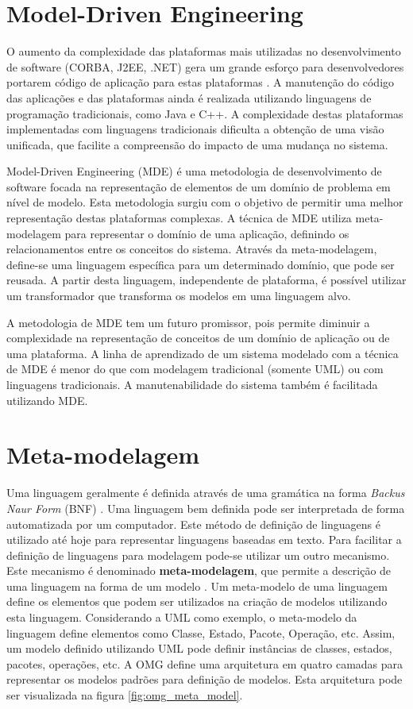 \section{Model-Driven Engineering}

O aumento da complexidade das plataformas mais utilizadas no desenvolvimento de software (CORBA, J2EE, .NET) gera um grande esforço para
desenvolvedores portarem código de aplicação para estas plataformas \cite{Schmidt:2006:GEI:1115688.1115706}. A manutenção do código das aplicações e
das plataformas ainda é realizada utilizando linguagens de programação tradicionais, como Java e C++. A complexidade destas plataformas implementadas
com linguagens tradicionais dificulta a obtenção de uma visão unificada, que facilite a compreensão do impacto de uma mudança no sistema.

Model-Driven Engineering (MDE)  é uma metodologia de desenvolvimento de software focada na representação de
elementos de um domínio de problema em nível de modelo. Esta metodologia surgiu com o objetivo de permitir uma melhor representação destas plataformas
complexas. A técnica de MDE utiliza meta-modelagem para representar o domínio de uma aplicação, definindo os relacionamentos entre os conceitos do
sistema. Através da meta-modelagem, define-se uma linguagem específica para um determinado domínio, que pode ser reusada. A partir desta linguagem,
independente de plataforma, é possível utilizar um transformador que transforma os modelos em uma linguagem alvo.

A metodologia de MDE tem um futuro promissor, pois permite diminuir a complexidade na representação de conceitos de um domínio de aplicação
ou de uma plataforma. A linha de aprendizado de um sistema modelado com a técnica de MDE é menor do que com modelagem tradicional (somente UML) ou com
linguagens tradicionais. A manutenabilidade do sistema também é facilitada utilizando MDE.

\section{Meta-modelagem}

Uma linguagem geralmente é definida através de uma gramática na forma \textit{Backus Naur Form} (BNF) . Uma linguagem
bem definida pode ser interpretada de forma automatizada por um computador. Este método de definição de linguagens é utilizado até hoje para
representar linguagens baseadas em texto. Para facilitar a definição de linguagens para modelagem pode-se utilizar um outro mecanismo. Este mecanismo
é denominado \textbf{meta-modelagem}, que permite a descrição de uma linguagem na forma de um modelo \cite{mda:03}. Um meta-modelo de uma linguagem define os 
elementos que podem ser utilizados na criação de modelos utilizando esta linguagem. Considerando a UML como exemplo, o meta-modelo da linguagem define
elementos como Classe, Estado, Pacote, Operação, etc. Assim, um modelo definido utilizando UML pode definir instâncias de classes, estados, pacotes, operações, etc. 
A OMG define uma arquitetura em quatro camadas para representar os modelos padrões para definição de modelos. Esta arquitetura pode ser visualizada
na figura \ref{fig:omg_meta_model}. 


